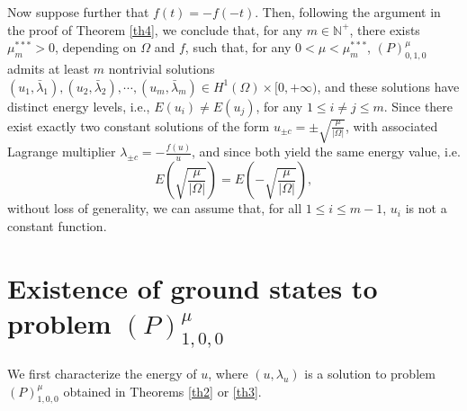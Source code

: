 \documentclass[11pt]{amsart}
\newcommand{\abs}[1]{\lvert#1\rvert}
\numberwithin{equation}{section}
\begin{document}
Now suppose further that $f(t)=-f(-t)$. Then, following the argument in the proof of Theorem \ref{th4}, we conclude that, for any $m \in \mathbb{N}^+$, there exists $\mu_{m}^{***} > 0$, depending on $\Omega$ and $f$, such that, for any $0 < \mu < \mu^{***}_{m}$,  $(P)^{\mu}_{0,1,0}$ admits at least $m$ nontrivial solutions $(u_1,\bar{\lambda}_1), (u_2,\bar{\lambda}_2),\cdots,(u_m,\bar{\lambda}_m) \in H^{1}(\Omega)\times[0,+\infty)$, and these solutions have distinct energy levels, i.e., $E(u_i) \neq E(u_j)$, for any $1\leq i\neq j \leq m$. Since there exist exactly two constant solutions of the form $u_{\pm c}=\pm\sqrt{\frac{\mu}{\abs{\Omega}}}$, with associated Lagrange multiplier $\lambda_{\pm c}=-\frac{f(u)}{u}$, and since both yield the same energy value, i.e. $$
E(\sqrt{\frac{\mu}{\abs{\Omega}}})=E(-\sqrt{\frac{\mu}{\abs{\Omega}}}),
$$
without loss of generality, we can assume that, for all $1\leq i\leq m-1$, $u_i$ is not a constant function.
\section{Existence of ground states to problem  \texorpdfstring{$(P)^\mu_{1,0,0}$}{Lg}}\label{secgs}

We first characterize the energy of $u$, where $(u,\lambda_u)$ is a solution to problem $(P)^{\mu}_{1,0,0}$ obtained in Theorems \ref{th2} or \ref{th3}.
\end{document}
